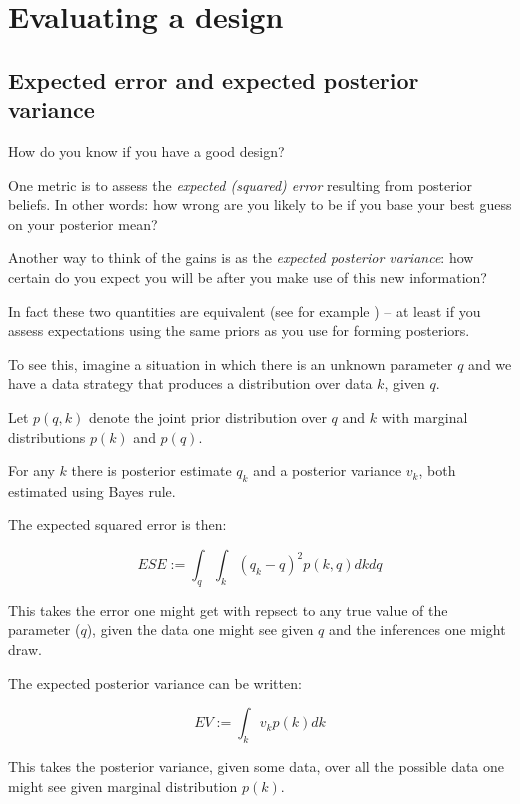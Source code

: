 \documentclass[12pt,]{book}
\begin{document}
\hypertarget{evaluating-a-design}{%
\section{Evaluating a design}\label{evaluating-a-design}}

\hypertarget{expected-error-and-expected-posterior-variance}{%
\subsection{Expected error and expected posterior variance}\label{expected-error-and-expected-posterior-variance}}

How do you know if you have a good design?

One metric is to assess the \emph{expected (squared) error} resulting from posterior beliefs. In other words: how wrong are you likely to be if you base your best guess on your posterior mean?

Another way to think of the gains is as the \emph{expected posterior variance}: how certain do you expect you will be after you make use of this new information?

In fact these two quantities are equivalent (see for example \citet{scharf1991statistical}) -- at least if you assess expectations using the same priors as you use for forming posteriors.

To see this, imagine a situation in which there is an unknown parameter \(q\) and we have a data strategy that produces a distribution over data \(k\), given \(q\).

Let \(p(q,k)\) denote the joint prior distribution over \(q\) and \(k\) with marginal distributions \(p(k)\) and \(p(q)\).

For any \(k\) there is posterior estimate \(q_k\) and a posterior variance \(v_k\), both estimated using Bayes rule.

The expected squared error is then:

\[ESE := \int_q\int_k \left({q}_k-q\right)^2p(k, q)dkdq \]

This takes the error one might get with repsect to any true value of the parameter (\(q\)), given the data one might see given \(q\) and the inferences one might draw.

The expected posterior variance can be written:

\[EV := \int_k v_k p(k)dk\]

This takes the posterior variance, given some data, over all the possible data one might see given marginal distribution \(p(k)\).
\end{document}
